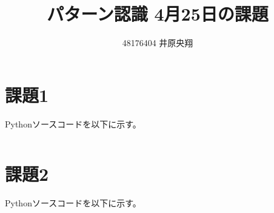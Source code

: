 \documentclass[uplatex,a4paper]{jsarticle}
\title{パターン認識 4月25日の課題}
\author{48176404 井原央翔}
\begin{document}
\maketitle
\section*{課題1}
Pythonソースコードを以下に示す。
\inputminted[linenos=true,breaklines=true,bgcolor=bg,fontsize=\footnotesize]{python}{assignment1.py}
\section*{課題2}
Pythonソースコードを以下に示す。
\inputminted[linenos=true,breaklines=true,bgcolor=bg,fontsize=\footnotesize]{python}{assignment2.py}
\end{document}
